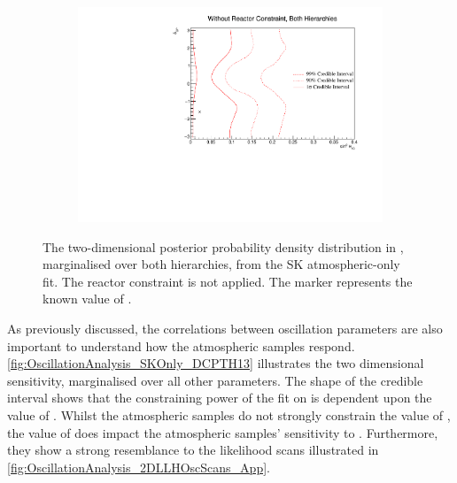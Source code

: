 \begin{figure}[h]
  \begin{subfigure}[t]{0.98\textwidth}
    \includegraphics[width=\textwidth, trim={0mm 0mm 0mm 0mm}, clip,page=1]{Figures/OA/SKOnlyFit/Contours_2D_th13_dcp_BH_0_woRC_UnSmeared_CredibleInterval.pdf}
  \end{subfigure}
  \caption{The two-dimensional posterior probability density distribution in , marginalised over both hierarchies, from the SK atmospheric-only fit. The reactor constraint is not applied. The marker represents the known value of .}
  \label{fig:OscillationAnalysis_SKOnly_DCPTH13}
\end{figure}

As previously discussed, the correlations between oscillation parameters are also important to understand how the atmospheric samples respond. \autoref{fig:OscillationAnalysis_SKOnly_DCPTH13} illustrates the two dimensional  sensitivity, marginalised over all other parameters.
The shape of the \quickmath{1\sigma} credible interval shows that the constraining power of the fit on  is dependent upon the value of .
Whilst the atmospheric samples do not strongly constrain the value of , the value of  does impact the atmospheric samples' sensitivity to .
Furthermore, they show a strong resemblance to the likelihood scans illustrated in \autoref{fig:OscillationAnalysis_2DLLHOscScans_App}.

